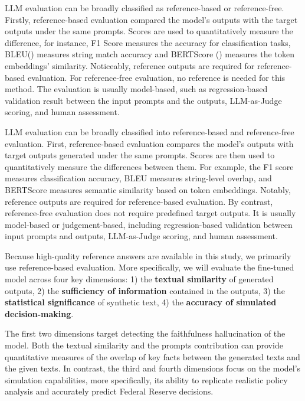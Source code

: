 LLM evaluation can be broadly classified as reference-based or reference-free. Firstly, reference-based evaluation compared the model's outputs with the target outputs under the same prompts. Scores are used to quantitatively measure the difference, for instance, F1 Score measures the accuracy for classification tasks, BLEU(\cite{papineni2002bleu}) measures string match accuracy and BERTScore (\cite{zhang2019bertscore}) measures the token embeddings' similarity. Noticeably, reference outputs are required for reference-based evaluation. For reference-free evaluation, no reference is needed for this method. The evaluation is usually model-based, such as regression-based validation result between the input prompts and the outputs, LLM-as-Judge scoring, and human assessment.


LLM evaluation can be broadly classified into reference-based and reference-free evaluation. First, reference-based evaluation compares the model’s outputs with target outputs generated under the same prompts. Scores are then used to quantitatively measure the differences between them. For example, the F1 score measures classification accuracy, BLEU \cite{papineni2002bleu} measures string-level overlap, and BERTScore \cite{zhang2019bertscore} measures semantic similarity based on token embeddings. Notably, reference outputs are required for reference-based evaluation. By contrast, reference-free evaluation does not require predefined target outputs. It is usually model-based or judgement-based, including regression-based validation between input prompts and outputs, LLM-as-Judge scoring, and human assessment.


Because high-quality reference answers are available in this study, we primarily use reference-based evaluation. More specifically, we will evaluate the fine-tuned model across four key dimensions:  1) the \textbf{textual similarity} of generated outputs, 2) the \textbf{sufficiency of information} contained in the outputs, 3) the \textbf{statistical significance} of synthetic text, 4) the \textbf{accuracy of simulated decision-making}. 


The first two dimensions target detecting the faithfulness hallucination of the model. Both the textual similarity and the prompts contribution can provide quantitative measures of the overlap of key facts between the generated texts and the given texts. In contrast, the third and fourth dimensions focus on the model’s simulation capabilities, more specifically, its ability to replicate realistic policy analysis and accurately predict Federal Reserve decisions.



